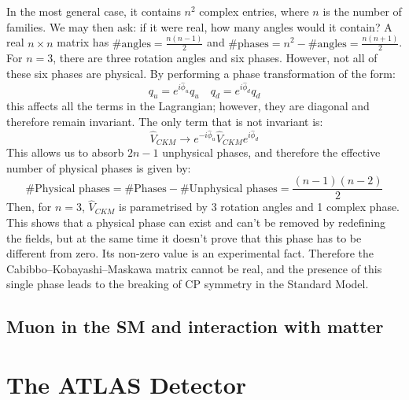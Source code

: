 \documentclass[11pt,a4paper,twoside,openright]{report}
\begin{document}
In the most general case, it contains \(n^2\) complex entries, where \(n\) is the number of families. We may then ask: if it were real, how many angles would it contain? A real \(n\times n\) matrix has \(\#\text{angles}=\frac{n(n-1)}{2}\) and \(\#\text{phases}=n^2-\#\text{angles}=\frac{n(n+1)}{2}\). For \(n=3\), there are three rotation angles and six phases. However, not all of these six phases are physical. By performing a phase transformation of the form:
\begin{equation}
q_u=e^{i\hat{\phi}_u}q_u \quad q_d=e^{i\hat{\phi}_d}q_d
\end{equation}
this affects all the terms in the Lagrangian; however, they are diagonal and therefore remain invariant. The only term that is not invariant is:
\begin{equation}
\hat{V}_{CKM}\longrightarrow e^{-i\hat{\phi}_u}\hat{V}_{CKM}e^{i\hat{\phi}_d}
\end{equation}
This allows us to absorb \(2n-1\) unphysical phases, and therefore the effective number of physical phases is given by:
\begin{equation}
\#\text{Physical phases}= \#\text{Phases} - \#\text{Unphysical phases}= \frac{(n-1)(n-2)}{2}
\end{equation}
Then, for \(n=3\), \(\hat{V}_{CKM}\) is parametrised by 3 rotation angles and 1 complex phase. 
This shows that a physical phase can exist and can't be removed by redefining the fields, but at the same time it doesn't prove that this phase has to be different from zero. Its non-zero value is an experimental fact.
Therefore the Cabibbo--Kobayashi--Maskawa matrix cannot be real, and the presence of this single phase leads to the breaking of CP symmetry in the Standard Model.

\section{Muon in the SM and interaction with matter}







\clearpage

\chapter{The ATLAS Detector}
\end{document}
